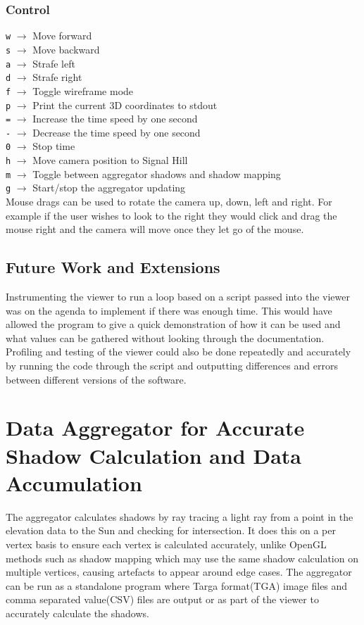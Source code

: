\documentclass[12pt]{report}
\begin{document}
\subsection{Control}

\texttt{w} $\rightarrow$ Move forward\\
\texttt{s} $\rightarrow$ Move backward\\
\texttt{a} $\rightarrow$ Strafe left\\
\texttt{d} $\rightarrow$ Strafe right\\
\texttt{f} $\rightarrow$ Toggle wireframe mode\\
\texttt{p} $\rightarrow$ Print the current 3D coordinates to stdout\\
\texttt{=} $\rightarrow$ Increase the time speed by one second\\
\texttt{-} $\rightarrow$ Decrease the time speed by one second\\
\texttt{0} $\rightarrow$ Stop time\\
\texttt{h} $\rightarrow$ Move camera position to Signal Hill\\
\texttt{m} $\rightarrow$ Toggle between aggregator shadows and shadow mapping\\
\texttt{g} $\rightarrow$ Start/stop the aggregator updating\\

Mouse drags can be used to rotate the camera up, down, left and right. For example if the user wishes to look to the right they would click and drag the mouse right and the camera will move once they let go of the mouse.

\section{Future Work and Extensions}
Instrumenting the viewer to run a loop based on a script passed into the viewer was on the agenda to implement if there was enough time. This would have allowed the program to give a quick demonstration of how it can be used and what values can be gathered without looking through the documentation. Profiling and testing of the viewer could also be done repeatedly and accurately by running the code through the script and outputting differences and errors between different versions of the software.

\chapter{Data Aggregator for Accurate Shadow Calculation and Data Accumulation}
The aggregator calculates shadows by ray tracing a light ray from a point in the elevation data to the Sun and checking for intersection. It does this on a per vertex basis to ensure each vertex is calculated accurately, unlike OpenGL methods such as shadow mapping which may use the same shadow calculation on multiple vertices, causing artefacts to appear around edge cases. The aggregator can be run as a standalone program where Targa format(TGA) image files and comma separated value(CSV) files are output or as part of the viewer to accurately calculate the shadows.
\end{document}
